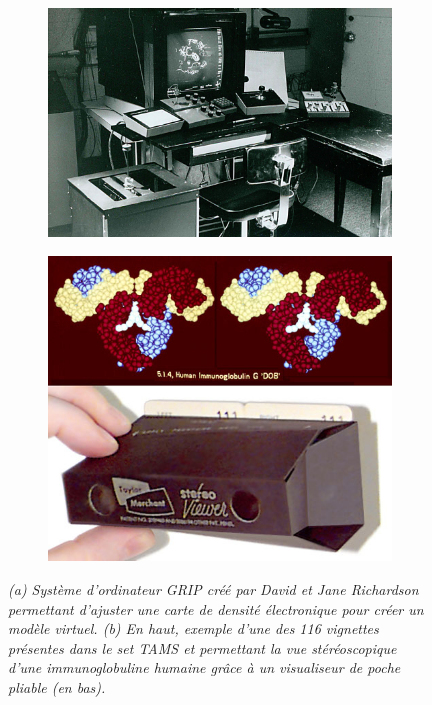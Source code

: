 \begin{figure}
  \begin{subfigure}{.5\textwidth}
  \centering
  {\includegraphics[width=0.9\linewidth]{./figures/ch1/richardson_grip_computer}}
  \caption{}
  \label{Fig:richardson_grip_computer}
  \end{subfigure}%
  \begin{subfigure}{.5\textwidth}
  \centering
  {\includegraphics[width=0.9\linewidth]{./figures/ch1/TAMS_viewer_slide}}    
  \caption{}
  \label{Fig:TAMS_viewer_slide}
  \end{subfigure}%
 \caption[]{\it (a) Système d'ordinateur GRIP créé par David et Jane Richardson permettant d'ajuster une carte de densité électronique pour créer un modèle virtuel.
  (b) En haut, exemple d'une des 116 vignettes présentes dans le set TAMS et permettant la vue stéréoscopique d'une immunoglobuline humaine grâce à un visualiseur de poche pliable (en bas).}
\end{figure}

